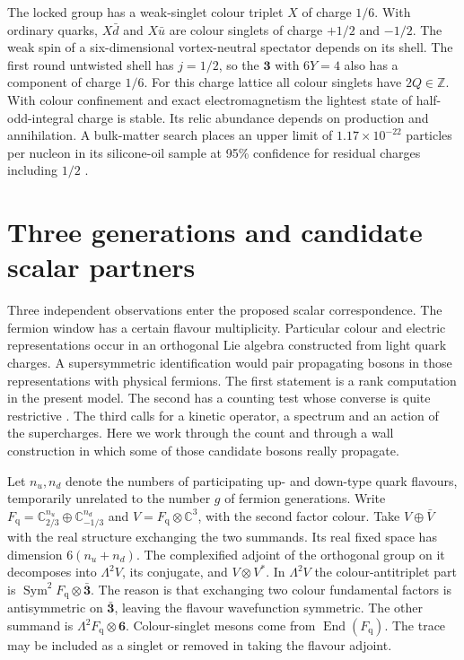 \documentclass[aps,prd,reprint,onecolumn,nofootinbib,amsmath,amssymb]{revtex4-2}
\begin{document}
The locked group has a weak-singlet colour triplet $X$ of charge $1/6$. With ordinary quarks, $X\bar d$ and $X\bar u$ are colour singlets of charge $+1/2$ and $-1/2$. The weak spin of a six-dimensional vortex-neutral spectator depends on its shell. The first round untwisted shell has $j=1/2$, so the $\mathbf3$ with $6Y=4$ also has a component of charge $1/6$. For this charge lattice all colour singlets have $2Q\in\mathbb Z$. With colour confinement and exact electromagnetism the lightest state of half-odd-integral charge is stable. Its relic abundance depends on production and annihilation. A bulk-matter search places an upper limit of $1.17\times10^{-22}$ particles per nucleon in its silicone-oil sample at 95\% confidence for residual charges including $1/2$ \cite{Lee2002Fractional}.

\section{Three generations and candidate scalar partners}
Three independent observations enter the proposed scalar correspondence. The fermion window has a certain flavour multiplicity. Particular colour and electric representations occur in an orthogonal Lie algebra constructed from light quark charges. A supersymmetric identification would pair propagating bosons in those representations with physical fermions. The first statement is a rank computation in the present model. The second has a counting test whose converse is quite restrictive \cite{Rivero2005,Rivero2024,realnote}. The third calls for a kinetic operator, a spectrum and an action of the supercharges. Here we work through the count and through a wall construction in which some of those candidate bosons really propagate.

Let $n_u,n_d$ denote the numbers of participating up- and down-type quark flavours, temporarily unrelated to the number $g$ of fermion generations. Write $F_{\mathrm q}=\mathbb C^{n_u}_{2/3}\oplus\mathbb C^{n_d}_{-1/3}$ and $V=F_{\mathrm q}\otimes\mathbb C^3$, with the second factor colour. Take $V\oplus\bar V$ with the real structure exchanging the two summands. Its real fixed space has dimension $6(n_u+n_d)$. The complexified adjoint of the orthogonal group on it decomposes into $\Lambda^2 V$, its conjugate, and $V\otimes V^*$. In $\Lambda^2 V$ the colour-antitriplet part is $\operatorname{Sym}^2F_{\mathrm q}\otimes\bar{\mathbf3}$. The reason is that exchanging two colour fundamental factors is antisymmetric on $\bar{\mathbf3}$, leaving the flavour wavefunction symmetric. The other summand is $\Lambda^2 F_{\mathrm q}\otimes\mathbf6$. Colour-singlet mesons come from $\operatorname{End}(F_{\mathrm q})$. The trace may be included as a singlet or removed in taking the flavour adjoint.
\end{document}
